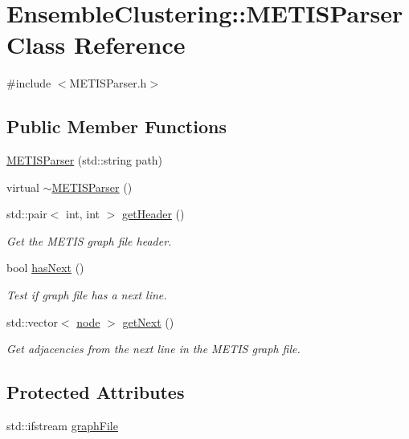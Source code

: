 \hypertarget{class_ensemble_clustering_1_1_m_e_t_i_s_parser}{\section{Ensemble\-Clustering\-:\-:M\-E\-T\-I\-S\-Parser Class Reference}
\label{class_ensemble_clustering_1_1_m_e_t_i_s_parser}
}


{\ttfamily \#include $<$M\-E\-T\-I\-S\-Parser.\-h$>$}

\subsection*{Public Member Functions}
\begin{DoxyCompactItemize}
\item 
\hyperlink{class_ensemble_clustering_1_1_m_e_t_i_s_parser_ae805ea274382960d50a6a4cab78272fd}{M\-E\-T\-I\-S\-Parser} (std\-::string path)
\item 
virtual \hyperlink{class_ensemble_clustering_1_1_m_e_t_i_s_parser_a5937df5903a58e15c0df1445a70fff5c}{$\sim$\-M\-E\-T\-I\-S\-Parser} ()
\item 
std\-::pair$<$ int, int $>$ \hyperlink{class_ensemble_clustering_1_1_m_e_t_i_s_parser_a6c11f188b2ca67435a63fc9c71d261e9}{get\-Header} ()
\begin{DoxyCompactList}\small\item\em Get the M\-E\-T\-I\-S graph file header. \end{DoxyCompactList}\item 
bool \hyperlink{class_ensemble_clustering_1_1_m_e_t_i_s_parser_aa9adb857b8ff519edfe94b7bc59ef12a}{has\-Next} ()
\begin{DoxyCompactList}\small\item\em Test if graph file has a next line. \end{DoxyCompactList}\item 
std\-::vector$<$ \hyperlink{namespace_ensemble_clustering_ae829290aeccd1a420b17a37fd901f114}{node} $>$ \hyperlink{class_ensemble_clustering_1_1_m_e_t_i_s_parser_a473d40949f87385130369a4f5d14b2ae}{get\-Next} ()
\begin{DoxyCompactList}\small\item\em Get adjacencies from the next line in the M\-E\-T\-I\-S graph file. \end{DoxyCompactList}\end{DoxyCompactItemize}
\subsection*{Protected Attributes}
\begin{DoxyCompactItemize}
\item 
std\-::ifstream \hyperlink{class_ensemble_clustering_1_1_m_e_t_i_s_parser_abe77511f89d17b6a043d38790b334151}{graph\-File}
\end{DoxyCompactItemize}


